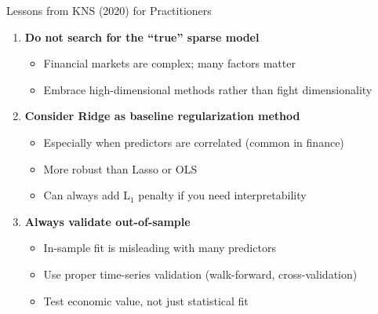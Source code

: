 \documentclass[10pt]{beamer}
\newcommand{\highlight}[1]{\textcolor{AccentOrange}{\textbf{#1}}}
\begin{document}
\begin{frame}{Lessons from KNS (2020) for Practitioners}
  
  \begin{enumerate}
    \item \highlight{Do not search for the ``true'' sparse model}
    \begin{itemize}
      \item Financial markets are complex; many factors matter
      \item Embrace high-dimensional methods rather than fight dimensionality
    \end{itemize}
    
    \vspace{0.5em}
    \item \textbf{Consider Ridge as baseline regularization method}
    \begin{itemize}
      \item Especially when predictors are correlated (common in finance)
      \item More robust than Lasso or OLS
      \item Can always add L$_1$ penalty if you need interpretability
    \end{itemize}
        
    \vspace{0.5em}
    \item \highlight{Always validate out-of-sample}
    \begin{itemize}
      \item In-sample fit is misleading with many predictors
      \item Use proper time-series validation (walk-forward, cross-validation)
      \item Test economic value, not just statistical fit
    \end{itemize}
  \end{enumerate}
\end{frame}


\end{document}
